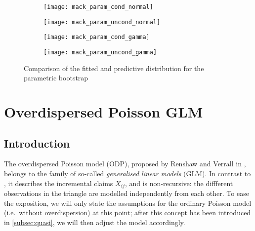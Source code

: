 \documentclass[a4paper]{book}
\begin{document}
\begin{landscape}
  \begin{figure}
    \centering
    \begin{subfigure}{0.45\linewidth}
      \texttt{[image: mack\_param\_cond\_normal]}
    \end{subfigure}
    \begin{subfigure}{0.45\linewidth}
      \texttt{[image: mack\_param\_uncond\_normal]}
    \end{subfigure}
    \begin{subfigure}{0.45\linewidth}
      \texttt{[image: mack\_param\_cond\_gamma]}
    \end{subfigure}
    \begin{subfigure}{0.45\linewidth}
      \texttt{[image: mack\_param\_uncond\_gamma]}
    \end{subfigure}
    \caption{Comparison of the fitted and predictive distribution for the parametric bootstrap}
    \label{fig:fit-pred-param}
  \end{figure}
\end{landscape}

\chapter{Overdispersed Poisson GLM} \label{chapter:poisson}

\section{Introduction} \label{sec:odp-intro}

The overdispersed Poisson model (ODP), proposed by Renshaw and Verrall in \cite{renshaw}, belongs to the family of so-called \emph{generalised linear models} (GLM). In contrast to , it describes the incremental claims $X_{ij}$, and is non-recursive: the diffferent observations in the triangle are modelled independently from each other. To ease the exposition, we will only state the assumptions for the ordinary Poisson model (i.e.\ without overdispersion) at this point; after this concept has been introduced in \cref{subsec:quasi}, we will then adjust the model accordingly.
\end{document}
